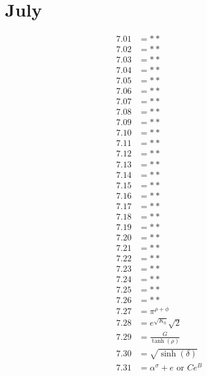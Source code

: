 \documentclass[12pt]{article}
\newcommand{\oder}{\text{ or }}
\begin{document}
\section{July}
\begin{align*}
7.01 &= **\\
7.02 &= **\\
7.03 &= **\\
7.04 &= **\\
7.05 &= **\\
7.06 &= **\\
7.07 &= **\\
7.08 &= **\\
7.09 &= **\\
7.10 &= **\\
7.11 &= **\\
7.12 &= **\\
7.13 &= **\\
7.14 &= **\\
7.15 &= **\\
7.16 &= **\\
7.17 &= **\\
7.18 &= **\\
7.19 &= **\\
7.20 &= **\\
7.21 &= **\\
7.22 &= **\\
7.23 &= **\\
7.24 &= **\\
7.25 &= **\\
7.26 &= **\\
7.27 &= \pi^{\rho + \phi}\\
7.28 &= e^{\sqrt{K_{0}}}\sqrt{2}\\
7.29 &= \frac{G}{\tanh(\rho)}\\
7.30 &= \sqrt{\sinh(\delta)}\\
7.31 &= \alpha^{\sigma} + e \oder C e^{B}\\
\end{align*}

\pagebreak
 
\end{document}
